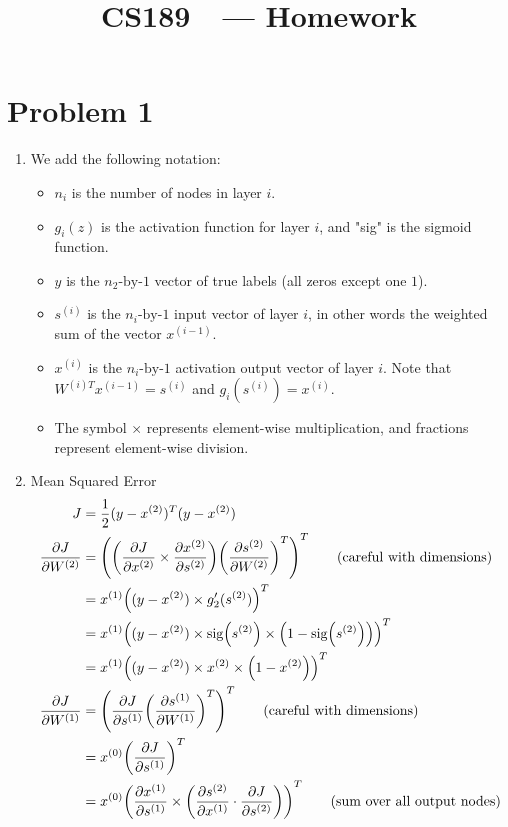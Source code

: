 \documentclass[11pt]{article}
\title{CS189\ \Session\  --- Homework \Homework}
\author{\Name}
\let\origleft\left
\let\origright\right
\renewcommand{\left}{\mathopen{}\mathclose\bgroup\origleft}
\renewcommand{\right}{\aftergroup\egroup\origright}
\newcommand{\p}[1]{\left(#1\right)}
\newcommand{\pderiv}[2]{\frac{\partial#1}{\partial#2}}
\newcommand{\sig}[1]{\text{sig}\p{#1}}
\begin{document}
\maketitle
{}
\setcounter{problemnumber}{0}

\section*{Problem 1}
\begin{enumerate}[(1)]
\item We add the following notation:
\begin{itemize}
\item $n_i$ is the number of nodes in layer $i$.
\item $g_i(z)$ is the activation function for layer $i$, and "sig" is the sigmoid function.
\item $y$ is the $n_2\text{-by-}1$ vector of true labels (all zeros except one $1$).
\item $s^{(i)}$ is the $n_i\text{-by-}1$ input vector of layer $i$, in other words the weighted sum of the vector $x^{(i-1)}$.
\item $x^{(i)}$ is the $n_i\text{-by-}1$ activation output vector of layer $i$. Note that $W^{(i)T}x^{(i-1)}=s^{(i)}$ and $g_i(s^{(i)})=x^{(i)}$.
\item The symbol $\times$ represents element-wise multiplication, and fractions represent element-wise division.
\end{itemize}
\item Mean Squared Error
\begin{align*}
J &= \frac12(y-x^{(2)})^T(y-x^{(2)})\\
\pderiv J{W^{(2)}} &= \p{\p{\pderiv J{x^{(2)}}\times\pderiv {x^{(2)}}{s^{(2)}}}\p{\pderiv{s^{(2)}}{W^{(2)}}}^T}^T\qquad\text{(careful with dimensions)}\\
&= x^{(1)}\p{(y-x^{(2)})\times g_2'(s^{(2)})}^T\\
&= x^{(1)}\p{(y-x^{(2)})\times \sig{s^{(2)}}\times\p{1-\sig{s^{(2)}}}}^T\\
&= x^{(1)}\p{(y-x^{(2)})\times x^{(2)}\times\p{1-x^{(2)}}}^T\\
\pderiv J{W^{(1)}} &= \p{\pderiv J{s^{(1)}}\p{\pderiv{s^{(1)}}{W^{(1)}}}^T}^T\qquad\text{(careful with dimensions)}\\
&= x^{(0)}\p{\pderiv J{s^{(1)}}}^T\\
&= x^{(0)}\p{\pderiv{x^{(1)}}{s^{(1)}}\times \p{\pderiv{s^{(2)}}{x^{(1)}}\cdot \pderiv J{s^{(2)}}}}^T\qquad\text{(sum over all output nodes)}\\

\end{align*}
\end{enumerate}
\end{document}
